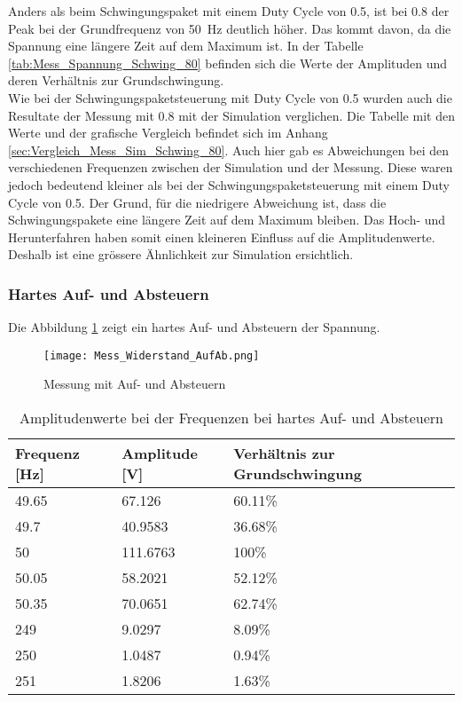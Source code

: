 Anders als beim Schwingungspaket mit einem Duty Cycle von 0.5, ist bei 0.8 der Peak bei der Grundfrequenz von \SI{50}{Hz} deutlich höher. Das kommt davon, da die Spannung eine längere Zeit auf dem Maximum ist.
In der Tabelle \ref{tab:Mess_Spannung_Schwing_80} befinden sich die Werte der Amplituden und deren Verhältnis zur Grundschwingung.\\
Wie bei der Schwingungspaketsteuerung mit Duty Cycle von 0.5 wurden auch die Resultate der Messung mit 0.8 mit der Simulation verglichen. Die Tabelle mit den Werte und der grafische Vergleich befindet sich im Anhang \ref{sec:Vergleich_Mess_Sim_Schwing_80}. Auch hier gab es Abweichungen bei den verschiedenen Frequenzen zwischen der Simulation und der Messung. Diese waren jedoch bedeutend kleiner als bei der Schwingungspaketsteuerung mit einem Duty Cycle von 0.5. Der Grund, für die niedrigere Abweichung ist, dass die Schwingungspakete eine längere Zeit auf dem Maximum bleiben. Das Hoch- und Herunterfahren haben somit einen kleineren Einfluss auf die Amplitudenwerte. Deshalb ist eine grössere Ähnlichkeit zur Simulation ersichtlich.



\newpage
\subsubsection*{Hartes Auf- und Absteuern}
Die Abbildung \ref{fig:Mess_Sanft} zeigt ein hartes Auf- und Absteuern der Spannung.

\begin{figure}[ht!]
	\centering
	\texttt{[image: Mess\_Widerstand\_AufAb.png]}	
	\caption{Messung mit Auf- und Absteuern}\label{fig:Mess_Sanft}
\end{figure}


\begin{table}[ht!]
	\centering
	\begin{tabular}{|l|l|l|}
		\hline
		Frequenz {[}Hz{]} & Amplitude {[}V{]} & Verhältnis zur Grundschwingung \\ \hline
		49.65             & 67.126            & 60.11\%                        \\ \hline
		49.7              & 40.9583           & 36.68\%                        \\ \hline
		50                & 111.6763          & 100\%                          \\ \hline
		50.05             & 58.2021           & 52.12\%                        \\ \hline
		50.35             & 70.0651           & 62.74\%                        \\ \hline
		249               & 9.0297            & 8.09\%                         \\ \hline
		250               & 1.0487            & 0.94\%                         \\ \hline
		251 		      & 1.8206            & 1.63\%                         \\ \hline
	\end{tabular}
\caption{Amplitudenwerte bei der Frequenzen bei hartes Auf- und Absteuern}\label{tab:Mess_Spannung_AufAb_hart}
\end{table}

